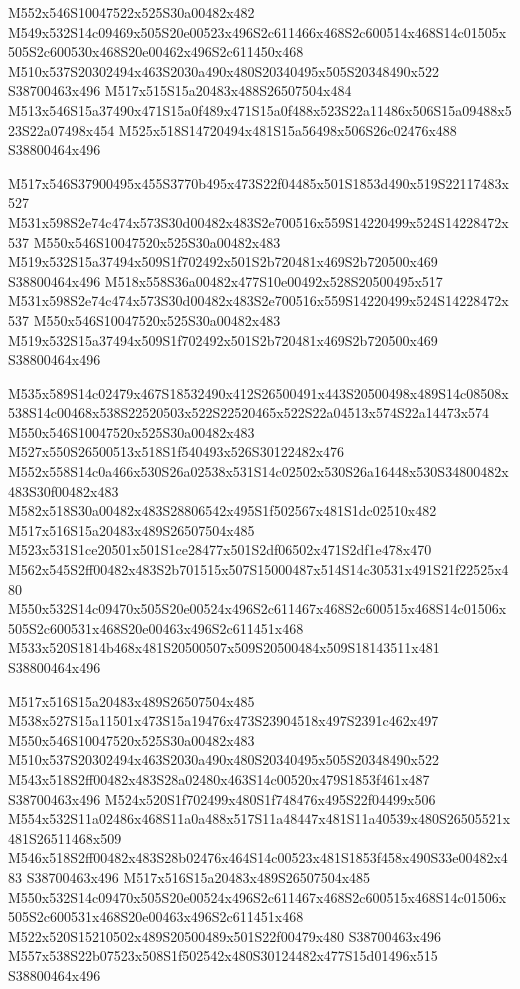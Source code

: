 \documentclass{article}
\begin{document}
\begin{multicols}{2}
M552x546S10047522x525S30a00482x482 M549x532S14c09469x505S20e00523x496S2c611466x468S2c600514x468S14c01505x505S2c600530x468S20e00462x496S2c611450x468 M510x537S20302494x463S2030a490x480S20340495x505S20348490x522 S38700463x496 M517x515S15a20483x488S26507504x484 M513x546S15a37490x471S15a0f489x471S15a0f488x523S22a11486x506S15a09488x523S22a07498x454 M525x518S14720494x481S15a56498x506S26c02476x488 S38800464x496 

M517x546S37900495x455S3770b495x473S22f04485x501S1853d490x519S22117483x527 M531x598S2e74c474x573S30d00482x483S2e700516x559S14220499x524S14228472x537 M550x546S10047520x525S30a00482x483 M519x532S15a37494x509S1f702492x501S2b720481x469S2b720500x469 S38800464x496 M518x558S36a00482x477S10e00492x528S20500495x517 M531x598S2e74c474x573S30d00482x483S2e700516x559S14220499x524S14228472x537 M550x546S10047520x525S30a00482x483 M519x532S15a37494x509S1f702492x501S2b720481x469S2b720500x469 S38800464x496

M535x589S14c02479x467S18532490x412S26500491x443S20500498x489S14c08508x538S14c00468x538S22520503x522S22520465x522S22a04513x574S22a14473x574 M550x546S10047520x525S30a00482x483 M527x550S26500513x518S1f540493x526S30122482x476 M552x558S14c0a466x530S26a02538x531S14c02502x530S26a16448x530S34800482x483S30f00482x483 M582x518S30a00482x483S28806542x495S1f502567x481S1dc02510x482 M517x516S15a20483x489S26507504x485 M523x531S1ce20501x501S1ce28477x501S2df06502x471S2df1e478x470 M562x545S2ff00482x483S2b701515x507S15000487x514S14c30531x491S21f22525x480 M550x532S14c09470x505S20e00524x496S2c611467x468S2c600515x468S14c01506x505S2c600531x468S20e00463x496S2c611451x468 M533x520S1814b468x481S20500507x509S20500484x509S18143511x481 S38800464x496

M517x516S15a20483x489S26507504x485 M538x527S15a11501x473S15a19476x473S23904518x497S2391c462x497 M550x546S10047520x525S30a00482x483 M510x537S20302494x463S2030a490x480S20340495x505S20348490x522 M543x518S2ff00482x483S28a02480x463S14c00520x479S1853f461x487 S38700463x496 M524x520S1f702499x480S1f748476x495S22f04499x506 M554x532S11a02486x468S11a0a488x517S11a48447x481S11a40539x480S26505521x481S26511468x509 M546x518S2ff00482x483S28b02476x464S14c00523x481S1853f458x490S33e00482x483 S38700463x496 M517x516S15a20483x489S26507504x485 M550x532S14c09470x505S20e00524x496S2c611467x468S2c600515x468S14c01506x505S2c600531x468S20e00463x496S2c611451x468 M522x520S15210502x489S20500489x501S22f00479x480 S38700463x496 M557x538S22b07523x508S1f502542x480S30124482x477S15d01496x515 S38800464x496


\end{multicols}
\end{document}
